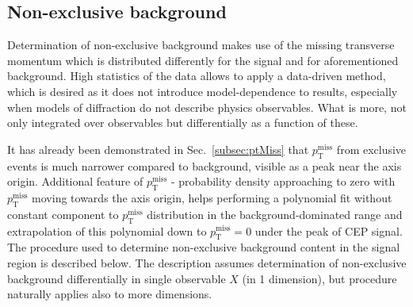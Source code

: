 \subsection{Non-exclusive background}\label{sec:nonExclBkgdDetermination}

Determination of non-exclusive background makes use of the missing transverse momentum which is distributed differently for the signal and for aforementioned background. High statistics of the data allows to apply a data-driven method, which is desired as it does not introduce model-dependence to results, especially when models of diffraction do not describe physics observables. What is more, not only integrated over observables but differentially as a function of these.

It has already been demonstrated in Sec.~\ref{subsec:ptMiss} that $p_{\text{T}}^{\text{miss}}$ from exclusive events is much narrower compared to background, visible as a peak near the axis origin. Additional feature of 
$p_{\text{T}}^{\text{miss}}$ - probability density approaching to zero with $p_{\text{T}}^{\text{miss}}$ moving towards the axis origin, helps performing a polynomial fit without constant component to $p_{\text{T}}^{\text{miss}}$ distribution in the background-dominated range and extrapolation of this polynomial down to $p_{\text{T}}^{\text{miss}} = 0$ under the peak of CEP signal. The procedure used to determine non-exclusive background content in the signal region is described below. The description assumes determination of non-exclusive background differentially in single observable $X$ (in 1 dimension), but procedure naturally applies also to more dimensions.

